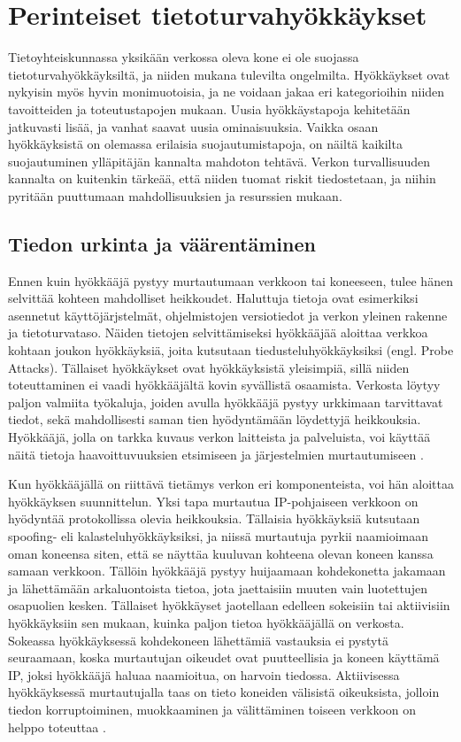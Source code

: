 
\chapter{Perinteiset tietoturvahyökkäykset}

Tietoyhteiskunnassa yksikään verkossa oleva kone ei ole suojassa tietoturvahyökkäyksiltä,
ja niiden mukana tulevilta ongelmilta. Hyökkäykset ovat nykyisin myös hyvin monimuotoisia, ja
ne voidaan jakaa eri kategorioihin niiden tavoitteiden ja toteutustapojen
mukaan. Uusia hyökkäystapoja kehitetään jatkuvasti lisää, ja vanhat saavat uusia
ominaisuuksia. Vaikka osaan hyökkäyksistä on olemassa erilaisia suojautumistapoja, 
on näiltä kaikilta suojautuminen ylläpitäjän kannalta mahdoton tehtävä. Verkon
turvallisuuden kannalta on kuitenkin tärkeää, että niiden tuomat riskit
tiedostetaan, ja niihin pyritään puuttumaan  mahdollisuuksien ja resurssien
mukaan.

\section{Tiedon urkinta ja väärentäminen}

Ennen kuin hyökkääjä pystyy murtautumaan verkkoon tai koneeseen, tulee hänen
selvittää kohteen mahdolliset heikkoudet. Haluttuja tietoja ovat esimerkiksi
asennetut käyttöjärjstelmät, ohjelmistojen versiotiedot ja verkon yleinen
rakenne ja tietoturvataso. Näiden tietojen selvittämiseksi hyökkääjää aloittaa verkkoa 
kohtaan joukon hyökkäyksiä, joita kutsutaan tiedusteluhyökkäyksiksi (engl. Probe Attacks). 
Tällaiset hyökkäykset ovat hyökkäyksistä yleisimpiä, sillä niiden toteuttaminen ei vaadi hyökkääjältä
kovin syvällistä osaamista. Verkosta löytyy paljon valmiita työkaluja,
joiden avulla hyökkääjä pystyy urkkimaan tarvittavat tiedot, sekä mahdollisesti
saman tien hyödyntämään löydettyjä heikkouksia. Hyökkääjä, jolla on tarkka
kuvaus verkon laitteista ja palveluista, voi käyttää näitä tietoja
haavoittuvuuksien etsimiseen ja järjestelmien murtautumiseen \cite{IDS}.

Kun hyökkääjällä on riittävä tietämys verkon eri komponenteista, voi hän aloittaa
hyökkäyksen suunnittelun. Yksi tapa murtautua IP-pohjaiseen verkkoon
on hyödyntää protokollissa olevia heikkouksia. Tällaisia hyökkäyksiä kutsutaan
spoofing- eli kalasteluhyökkäyksiksi, ja niissä murtautuja pyrkii naamioimaan oman koneensa
siten, että se näyttäa kuuluvan kohteena olevan koneen kanssa samaan verkkoon.
Tällöin hyökkääjä pystyy huijaamaan kohdekonetta jakamaan ja lähettämään
arkaluontoista tietoa, jota jaettaisiin muuten vain luotettujen osapuolien kesken.
Tällaiset hyökkäyset jaotellaan edelleen sokeisiin tai aktiivisiin hyökkäyksiin sen mukaan, 
kuinka paljon tietoa hyökkääjällä on verkosta. Sokeassa hyökkäyksessä kohdekoneen
lähettämiä vastauksia ei pystytä seuraamaan, koska  murtautujan oikeudet ovat puutteellisia
ja koneen käyttämä IP, joksi hyökkääjä haluaa naamioitua, on harvoin tiedossa.
Aktiivisessa hyökkäyksessä murtautujalla taas on tieto koneiden välisistä oikeuksista,
jolloin tiedon korruptoiminen, muokkaaminen ja välittäminen toiseen verkkoon
on helppo toteuttaa \cite{WEBS}.

